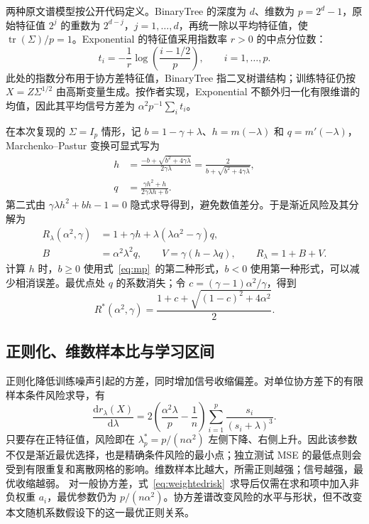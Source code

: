 \documentclass[UTF8,fontset=fandol,a4paper,zihao=-4]{ctexart}
\DeclareMathOperator{\tr}{tr}
\begin{document}
两种原文谱模型按公开代码定义。BinaryTree 的深度为 $d$、维数为 $p=2^d-1$，原始特征值 $2^j$ 的重数为 $2^{d-j}$，$j=1,\ldots,d$，再统一除以平均特征值，使 $\tr(\Sigma)/p=1$。Exponential 的特征值采用指数率 $r>0$ 的中点分位数：
\begin{equation}\label{eq:exponential_spectrum}
 t_i=-\frac{1}{r}\log\!\left(\frac{i-1/2}{p}\right),\qquad i=1,\ldots,p.
\end{equation}
此处的指数分布用于协方差特征值，BinaryTree 指二叉树谱结构；训练特征仍按 $X=Z\Sigma^{1/2}$ 由高斯变量生成。按作者实现，Exponential 不额外归一化有限维谱的均值，因此其平均信号方差为 $\alpha^2p^{-1}\sum_i t_i$。

在本次复现的 $\Sigma=I_p$ 情形，记 $b=1-\gamma+\lambda$、$h=m(-\lambda)$ 和 $q=m'(-\lambda)$，Marchenko--Pastur 变换可显式写为\cite[式（7）]{dw}
\begin{align}
 h&=\frac{-b+\sqrt{b^2+4\gamma\lambda}}{2\gamma\lambda}
   =\frac{2}{b+\sqrt{b^2+4\gamma\lambda}},\label{eq:mp}\\
 q&=\frac{\gamma h^2+h}{2\gamma\lambda h+b}.
 \label{eq:q}
\end{align}
第二式由 $\gamma\lambda h^2+bh-1=0$ 隐式求导得到，避免数值差分。于是渐近风险及其分解为
\begin{align}
 R_\lambda(\alpha^2,\gamma)&=1+\gamma h+\lambda(\lambda\alpha^2-\gamma)q,
 \label{eq:identityrisk}\\
 B&=\alpha^2\lambda^2q,\qquad V=\gamma(h-\lambda q),\qquad R_\lambda=1+B+V.
 \label{eq:asymbv}
\end{align}
计算 $h$ 时，$b\geq0$ 使用式~\eqref{eq:mp}~的第二种形式，$b<0$ 使用第一种形式，可以减少相消误差。最优点处 $q$ 的系数消失；令 $c=(\gamma-1)\alpha^2/\gamma$，得到
\begin{equation}\label{eq:optimalidentity}
 R^*(\alpha^2,\gamma)
 =\frac{1+c+\sqrt{(1-c)^2+4\alpha^2}}{2}.
\end{equation}

\subsection{正则化、维数样本比与学习区间}
正则化降低训练噪声引起的方差，同时增加信号收缩偏差。对单位协方差下的有限样本条件风险求导，有
\begin{equation}\label{eq:riskderivative}
 \frac{\mathrm dr_\lambda(X)}{\mathrm d\lambda}
 =2\left(\frac{\alpha^2\lambda}{p}-\frac{1}{n}\right)
 \sum_{i=1}^{p}\frac{s_i}{(s_i+\lambda)^3}.
\end{equation}
只要存在正特征值，风险即在 $\lambda_p^*=p/(n\alpha^2)$ 左侧下降、右侧上升。因此该参数不仅是渐近最优选择，也是精确条件风险的最小点；独立测试 MSE 的最低点则会受到有限重复和离散网格的影响。维数样本比越大，所需正则越强；信号越强，最优收缩越弱。
对一般协方差，式~\eqref{eq:weightedrisk}~求导后仅需在求和项中加入非负权重 $a_i$，最优参数仍为 $p/(n\alpha^2)$。协方差谱改变风险的水平与形状，但不改变本文随机系数假设下的这一最优正则关系。
\end{document}
